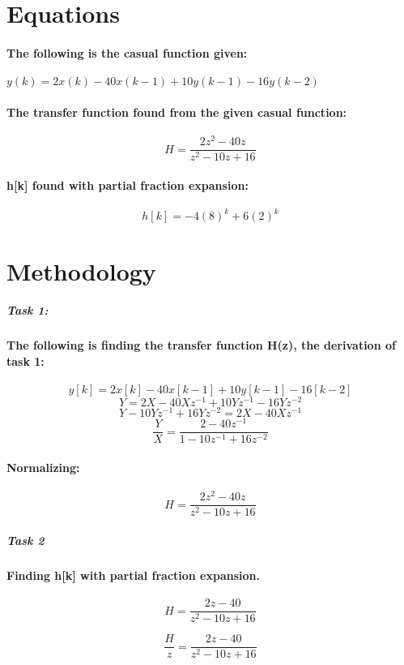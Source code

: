 \documentclass[12pt,a4paper]{article}
\begin{document}
\section{Equations}\label{sec:lit-rev}


\paragraph{The following is the casual function given: }
$y(k) = 2x(k) - 40x(k - 1) + 10y(k - 1) - 16y(k-2)$

\paragraph{The transfer function found from the given casual function:}
$$H = \frac{2z^{2}-40z}{z^2 - 10z + 16}$$

\paragraph{h[k] found with partial fraction expansion:}
$$h[k] = -4(8)^k+ 6(2)^k$$


\section{Methodology}\label{sec:meth}

\subparagraph{\Large Task 1:}

\paragraph{The following is finding the transfer function H(z), the derivation of task 1:}
$$y[k] = 2x[k] - 40x[k-1] + 10y[k-1] - 16[k-2]$$
$$Y = 2X - 40X z^{-1} + 10Yz^{-1} - 16Yz^{-2}$$
$$Y - 10Yz^{-1} + 16Yz^{-2} = 2X - 40X z^{-1}$$
$$\frac{Y}{X} = \frac{2-40z^{-1}}{1 - 10z^{-1} + 16z^{-2}}$$
\paragraph{Normalizing:}

$$H = \frac{2z^{2}-40z}{z^2 - 10z + 16}$$

\subparagraph{\large Task 2}
\paragraph{Finding h[k] with partial fraction expansion.}

$$H = \frac{2z-40}{z^2 - 10z + 16}$$

$$\frac{H}{z} = \frac{2z-40}{z^2 - 10z + 16}$$
\end{document}
